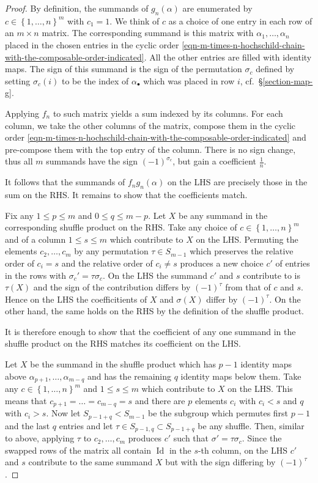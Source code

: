 \documentclass[12pt,a4paper,reqno]{amsart}
\DeclareMathOperator{\id}{Id}
\begin{document}
\begin{proof}
By definition, the summands of $g_n(\alpha)$ are enumerated by $c \in
\left\{1,\dots,n\right\}^m$ with $c_1 = 1$. We think of $c$ as a
choice of one entry in each row of an $m \times n$ matrix. The
corresponding summand is this matrix with $\alpha_1, \dots, \alpha_n$ 
placed in the chosen entries in the cyclic order 
\eqref{eqn-m-times-n-hochschild-chain-with-the-composable-order-indicated}. 
All the other entries are filled with identity maps. 
The sign of this summand is the sign of 
the permutation $\sigma_c$ defined by setting $\sigma_c(i)$ to be 
the index of $\alpha_\bullet$ which was placed in row $i$,
cf.~\S\ref{section-map-g}. 

Applying $f_n$ to such matrix yields a sum indexed by its columns. 
For each column, we take 
the other columns of the matrix, compose them in the cyclic order 
\eqref{eqn-m-times-n-hochschild-chain-with-the-composable-order-indicated}
and pre-compose them with the top entry of the column. There is no
sign change, thus all $m$ summands have the sign $(-1)^{\sigma_c}$,
but gain a coefficient $\frac{1}{n}$. 

It follows that the summands of $f_n g_n(\alpha)$ on the LHS 
are precisely those in the sum on the RHS. It remains to show 
that the coefficients match. 

Fix any $1 \leq p \leq m$ and $0 \leq q \leq m-p$. Let $X$ be
any summand in the corresponding shuffle product on the RHS.  
Take any choice of $c \in \left\{1,\dots,n\right\}^m$ 
and of a column $1 \leq s \leq m$ which contribute to $X$ 
on the LHS. Permuting the elements $c_2, \dots, c_m$ by any permutation 
$\tau \in S_{m-1}$ which preserves the relative order of $c_i = s$ 
and the relative order of $c_i \neq s$ produces a new 
choice $c'$ of entries in the rows with $\sigma_c' = \tau \sigma_c$. 
On the LHS the summand $c'$ and $s$ contribute to is $\tau(X)$
and the sign of the contribution differs by $(-1)^\tau$ 
from that of $c$ and $s$. Hence on the LHS the coefficitients 
of $X$ and $\sigma(X)$ differ by $(-1)^\tau$. On the other hand, 
the same holds on the RHS by the definition of the shuffle product. 

It is therefore enough to show that the coefficient of any one summand 
in the shuffle product on the RHS matches its coefficient on the LHS.  

Let $X$ be the summand in the shuffle product which has $p-1$
identity maps above $\alpha_{p+1}, \dots, \alpha_{m-q}$ and has the
remaining $q$ identity maps below them. Take any 
$c \in \left\{1,\dots,n\right\}^m$ and $1 \leq s \leq m$ 
which contribute to $X$ on the LHS. This means
that $c_{p+1} = \dots = c_{m-q} = s$ and there are $p$ elements $c_i$ 
with $c_i < s$ and $q$ with $c_i > s$. Now let $S_{p-1+q} < S_{m-1}$ be
the subgroup which permutes first $p-1$ and the last $q$ entries and
let $\tau \in S_{p-1,q} \subset S_{p-1+q}$ be any shuffle. Then, 
similar to above, applying $\tau$ to $c_2, \dots, c_m$ produces 
$c'$ such that $\sigma' = \tau \sigma_c$. Since the swapped rows 
of the matrix all contain $\id$ in the $s$-th column, 
on the LHS $c'$ and $s$ contribute to the same summand $X$ 
but with the sign differing by $(-1)^\tau$. 


\end{proof}
\end{document}
